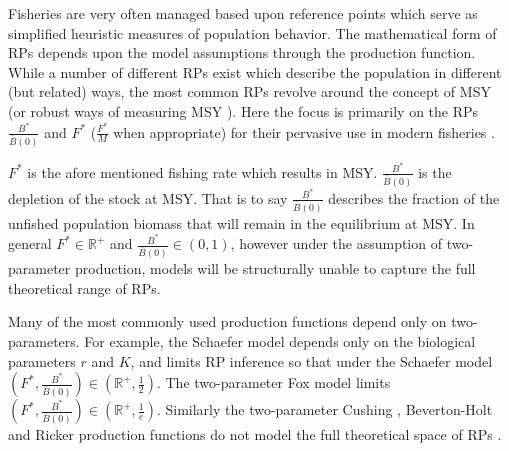 \documentclass[12pt]{ucscthesis}
\begin{document}
{%
Fisheries are very often managed based upon reference points %
which serve as simplified heuristic measures of population behavior. The
mathematical form of RPs depends upon the model assumptions through the
production function. %
While a number of different RPs exist which describe the population in different
(but related) ways, the most common RPs revolve around the concept of MSY (or robust
ways of measuring MSY \cite{hilborn_pretty_2010,punt_management_2016}).
Here the focus is primarily on the RPs $\frac{B^*}{\bar B(0)}$ and $F^*$ ($\frac{F^*}{M}$ when appropriate)
for their pervasive use in modern fisheries \cite{punt_extending_2019}. %

%
$F^*$ is the afore mentioned fishing rate which results in MSY. $\frac{B^*}{\bar B(0)}$
is the depletion of the stock at MSY. That is to say $\frac{B^*}{\bar B(0)}$ describes
the fraction of the unfished population biomass that will remain in the equilibrium
at MSY. In general $F^*\in\mathbb{R}^+$ and \mbox{$\frac{B^*}{\bar B(0)}\in\left(0, 1\right)$,}
however under the assumption of two-parameter production, %
models will be structurally unable to capture the full theoretical range of RPs.

%
Many of the most commonly used production functions depend only
on two-parameters. For example, the Schaefer model %
depends only on the biological parameters $r$ and $K$, and limits RP inference
so that under the Schaefer model $\left(F^*, \frac{B^*}{\bar B(0)}\right)\in \left(\mathbb{R}^+, \frac{1}{2}\right)$.
The two-parameter Fox model \cite{fox_jr_exponential_1970} limits $\left(F^*, \frac{B^*}{\bar B(0)}\right)\in \left(\mathbb{R}^+, \frac{1}{e}\right)$.
Similarly the two-parameter Cushing \cite{cushing_dependence_1971}, Beverton-Holt \cite[BH]{beverton_dynamics_1957}
and Ricker \cite{ricker_stock_1954} production functions do not model the full theoretical space of
RPs \cite{mangel_perspective_2013, yeakel_generalized_2015}.

}
\end{document}
